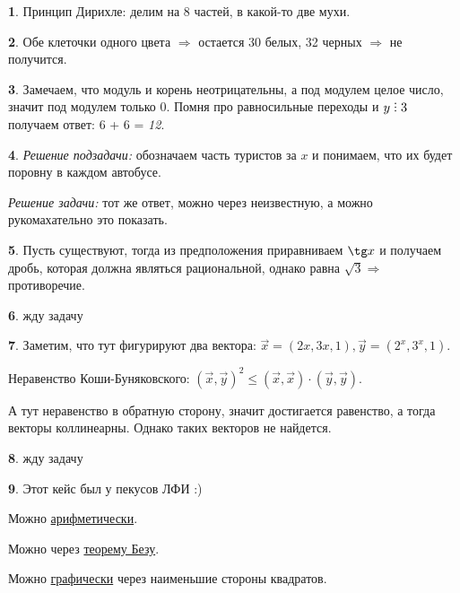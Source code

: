\documentclass[14pt, a4paper]{extarticle}
\theoremstyle{definition}
\newtheorem{problem}{}
\theoremstyle{definition}
\theoremstyle{remark}
\numberwithin{equation}{section}
\DeclareRobustCommand{\divby}{%
  \mathrel{\text{\vbox{\baselineskip.65ex\lineskiplimit0pt\hbox{.}\hbox{.}\hbox{.}}}}%
}
\begin{document}
\begin{problem}
    Принцип Дирихле: делим на 8 частей, в какой-то две мухи.
\end{problem}

\begin{problem}
    Обе клеточки одного цвета $\Rightarrow$ остается 30 белых, 32 черных
    $\Rightarrow$ не получится.
\end{problem}

\begin{problem}
    Замечаем, что модуль и корень неотрицательны, а под модулем 
    целое число, значит под модулем только 0. Помня про равносильные
    переходы и $y \divby 3$ получаем ответ: 6 + 6 = \textit{12}.
\end{problem}

\begin{problem}
    \textit{Решение подзадачи:} обозначаем часть туристов за $x$ и понимаем,
    что их будет поровну в каждом автобусе.

    \textit{Решение задачи:} тот же ответ, можно через неизвестную,
    а можно рукомахательно это показать.
\end{problem}

\begin{problem}
    Пусть существуют, тогда из предположения приравниваем $\tg x$ и получаем
    дробь, которая должна являться рациональной, однако равна $\sqrt{3}
    \Rightarrow$ противоречие.
\end{problem}

\begin{problem}
    жду задачу
\end{problem}

\begin{problem}
    Заметим, что тут фигурируют два вектора: $\vec{x} = (2x, 3x, 1),
    \vec{y} = (2^x, 3^x, 1)$.

    Неравенство Коши-Буняковского: $(\vec{x}, \vec{y})^2 \leqslant
    (\vec{x}, \vec{x}) \cdot (\vec{y}, \vec{y})$.

    А тут неравенство в обратную сторону, значит достигается равенство,
    а тогда векторы коллинеарны. Однако таких векторов не найдется.
\end{problem}

\begin{problem}
    жду задачу
\end{problem}

\begin{problem}
    Этот кейс был у пекусов ЛФИ :)

    Можно \href{https://youtu.be/SSUCYC-nF6g}{арифметически}.

    Можно через \href{https://youtu.be/UdVr4Ak-E78}{теорему Безу}.

    Можно \href{https://youtu.be/-Gik7bfQxDM}{графически} через наименьшие стороны квадратов.
\end{problem}
\end{document}
